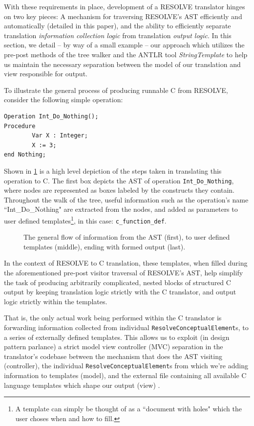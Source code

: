 \documentclass[times]{speauth}
\begin{document}
With these requirements in place, development of a RESOLVE translator hinges on two key pieces: A mechanism for traversing RESOLVE's AST efficiently and automatically (detailed in this paper), and the ability to efficiently separate translation \textit{information collection logic} from translation \textit{output logic}. In this section, we detail -- by way of a small example -- our approach which utilizes the pre-post methods of the tree walker and the ANTLR tool \textit{StringTemplate} to help us maintain the necessary separation between the model of our translation and view responsible for output.

To illustrate the general process of producing runnable C from RESOLVE, consider the following simple operation:

\begin{verbatim}
Operation Int_Do_Nothing(); 
Procedure
        Var X : Integer;
        X := 3;
end Nothing;
\end{verbatim}

Shown in \ref{fig:translationflow} is a high level depiction of the steps taken in translating this operation to C. The first box depicts the AST of operation \texttt{Int\_Do\_Nothing}, where nodes are represented as boxes labeled by the constructs they contain. Throughout the walk of the tree, useful information such as the operation's name ``Int\_Do\_Nothing" are extracted from the nodes, and added as parameters to user defined templates\footnote{A template can simply be thought of as a ``document with holes" which the user choses when and how to fill.}, in this case: \texttt{c\_function\_def}.

\begin{figure}
\centering
\caption{The general flow of information from the AST (first), to user defined templates (middle), ending with formed output (last).}
\label{fig:translationflow}
\end{figure}

In the context of RESOLVE to C translation, these templates, when filled during the aforementioned pre-post visitor traversal of RESOLVE's AST, help simplify the task of producing arbitrarily complicated, nested blocks of structured C output by keeping translation logic strictly with the C translator, and output logic strictly within the templates.

That is, the only actual work being performed within the C translator is forwarding information collected from individual \texttt{ResolveConceptualElement}s, to a series of externally defined templates. This allows us to exploit (in design pattern parlance) a strict model view controller (MVC) separation in the translator's codebase between the mechanism that does the AST visiting (controller), the individual \texttt{ResolveConceptualElement}s from which we're adding information to templates (model), and the external file containing all available C language templates which shape our output (view) \cite{krasner:1988}.
\end{document}
